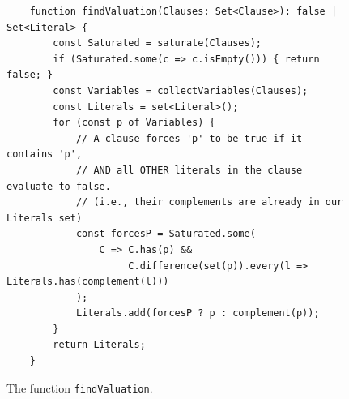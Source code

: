 \begin{figure}[!ht]
\centering
\begin{verbatim}
    function findValuation(Clauses: Set<Clause>): false | Set<Literal> {
        const Saturated = saturate(Clauses);
        if (Saturated.some(c => c.isEmpty())) { return false; }        
        const Variables = collectVariables(Clauses);
        const Literals = set<Literal>(); 
        for (const p of Variables) {
            // A clause forces 'p' to be true if it contains 'p', 
            // AND all OTHER literals in the clause evaluate to false.
            // (i.e., their complements are already in our Literals set)
            const forcesP = Saturated.some(
                C => C.has(p) && 
                     C.difference(set(p)).every(l => Literals.has(complement(l)))
            );
            Literals.add(forcesP ? p : complement(p));
        }    
        return Literals;
    }
\end{verbatim}
\vspace*{-0.3cm}
\caption{The function \texttt{findValuation}.}
\label{fig:Completeness.ipynb-3}
\end{figure}

\FloatBarrier

